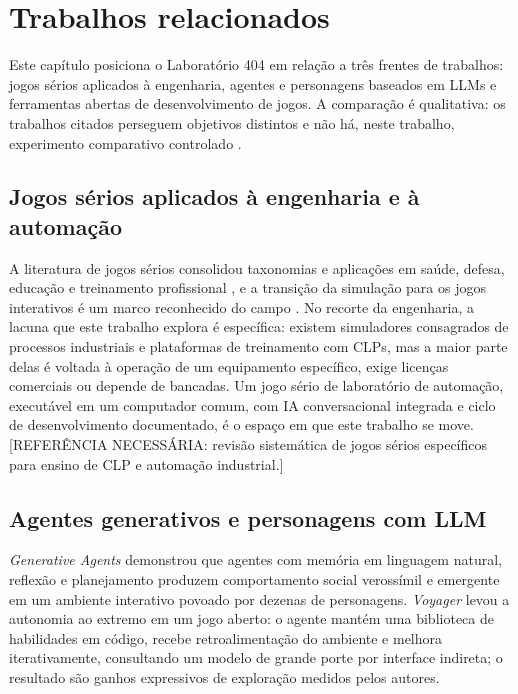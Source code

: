 \chapter{Trabalhos relacionados}
\label{cap:relacionados}

Este capítulo posiciona o Laboratório 404 em relação a três frentes de
trabalhos: jogos sérios aplicados à engenharia, agentes e personagens
baseados em LLMs e ferramentas abertas de desenvolvimento de jogos. A
comparação é qualitativa: os trabalhos citados perseguem objetivos distintos
e não há, neste trabalho, experimento comparativo controlado
\cite{wohlin2012experimentation}.

\section{Jogos sérios aplicados à engenharia e à automação}
\label{sec:rel_jogos}

A literatura de jogos sérios consolidou taxonomias e aplicações em saúde,
defesa, educação e treinamento profissional \cite{laamarti2014overview}, e a
transição da simulação para os jogos interativos é um marco reconhecido do
campo \cite{zyda2005from}. No recorte da engenharia, a lacuna que este
trabalho explora é específica: existem simuladores consagrados de processos
industriais e plataformas de treinamento com CLPs, mas a maior parte delas é
voltada à operação de um equipamento específico, exige licenças comerciais ou
depende de bancadas. Um jogo sério de laboratório de automação, executável em
um computador comum, com IA conversacional integrada e ciclo de
desenvolvimento documentado, é o espaço em que este trabalho se move.
[REFERÊNCIA NECESSÁRIA: revisão sistemática de jogos sérios específicos para
ensino de CLP e automação industrial.]

\section{Agentes generativos e personagens com LLM}
\label{sec:rel_agentes}

\emph{Generative Agents} \cite{park2023generative} demonstrou que agentes com
memória em linguagem natural, reflexão e planejamento produzem comportamento
social verossímil e emergente em um ambiente interativo povoado por dezenas de
personagens. \emph{Voyager} \cite{wang2023voyager} levou a autonomia ao
extremo em um jogo aberto: o agente mantém uma biblioteca de habilidades em
código, recebe retroalimentação do ambiente e melhora iterativamente,
consultando um modelo de grande porte por interface indireta; o resultado são
ganhos expressivos de exploração medidos pelos autores.

